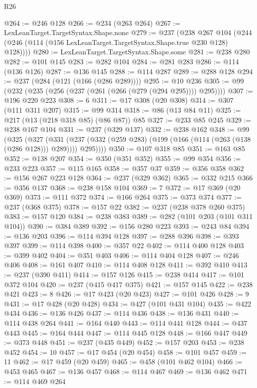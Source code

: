 \begin{lexlean}{R26}
\begin{coremodule}
@264 := @246 @128
@266 := @234 (@263 @264)
@267 := LexLeanTarget.TargetSyntax.Shape.none
@279 := @237
    (@238
      @267
      @104
      (@244 (@246 (@114 (@156 LexLeanTarget.TargetSyntax.Shape.true @230 @128) @128))))
@280 := LexLeanTarget.TargetSyntax.Shape.some
@281 := @238 @280
@282 := @101 @145
@283 := @282 @104
@284 := @281 @283
@286 := @114 (@136 @126)
@287 := @136 @145
@288 := @114 @287
@289 := @288 @128
@294 := @237 (@284 (@121 (@166 (@286 @289))))
@295 := @10 @236
@305 := @99 (@232 (@235 (@256 (@237 (@261 (@266 (@279 (@294 @295)))) @295))))
@307 := @196 @220 @223
@308 := 6
@311 := @17 @308 (@20 @308)
@314 := @307 (@111 @311 @207)
@315 := @99 @314
@318 := @86 (@13 @84 @11)
@325 := @217 (@13 (@218 @318 @85) (@86 @87)) @85
@327 := @233 @85 @245
@329 := @238 @167 @104
@331 := @237 (@329 @137)
@332 := @238 @162
@348 := @99
    (@325
      (@327
        (@331 (@237 (@332 (@259 @283) (@199 (@166 (@114 (@263 (@138 (@286 @128))) @289)))) @295))))
@350 := @107 @318 @85
@351 := @163 @85
@352 := @138 @207
@354 := @350 (@351 @352)
@355 := @99 @354
@356 := @233 @223
@357 := @115 @165
@358 := @357 @37
@359 := @356 @358
@362 := @156 @267 @223 @128
@364 := @237 (@329 @362)
@365 := @332 @215
@366 := @356 @137
@368 := @238 @158 @104
@369 := 7
@372 := @17 @369 (@20 @369)
@373 := @111 @372
@374 := @166 @264
@375 := @373 @374
@377 := @237 (@368 @375)
@378 := @157 @22
@382 := @237 (@238 @378 @260 @375)
@383 := @157 @120
@384 := @238 @383
@389 := @282 (@101 @203 (@101 @311 @104))
@390 := @384 @389
@392 := @156 @280 @223
@393 := @243 @84
@394 := @136 @203
@396 := @114 @394 @128
@397 := @288 @396
@398 := @393 @397
@399 := @114 @398
@400 := @357 @22
@402 := @114 @400 @128
@403 := @399 @402
@404 := @351 @403
@406 := @114 @404 @128
@407 := @246 @406
@408 := @161 @407
@410 := @114 @408 @128
@411 := @392 @410
@413 := @237 (@390 @411)
@414 := @157 @126
@415 := @238 @414
@417 := @101 @372 @104
@420 := @237 (@415 @417 @375)
@421 := @157 @145
@422 := @238 @421
@423 := 8
@426 := @17 @423 (@20 @423)
@427 := @101 @426
@428 := 9
@431 := @17 @428 (@20 @428)
@434 := @427 (@101 @431 @104)
@435 := @422 @434
@436 := @136 @426
@437 := @114 @436
@438 := @136 @431
@440 := @114 @438 @264
@441 := @164 @440
@443 := @114 @441 @128
@444 := @437 @443
@445 := @164 @444
@447 := @114 @445 @128
@448 := @166 @447
@449 := @373 @448
@451 := @237 (@435 @449)
@452 := @157 @203
@453 := @238 @452
@454 := 10
@457 := @17 @454 (@20 @454)
@458 := @101 @457
@459 := 11
@462 := @17 @459 (@20 @459)
@465 := @458 (@101 @462 @104)
@466 := @453 @465
@467 := @136 @457
@468 := @114 @467
@469 := @136 @462
@471 := @114 @469 @264

\end{coremodule}
\end{lexlean}
